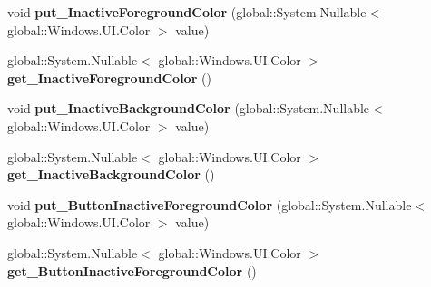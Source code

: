 \begin{DoxyCompactItemize}
void {\bfseries put\+\_\+\+Inactive\+Foreground\+Color} (global\+::\+System.\+Nullable$<$ global\+::\+Windows.\+U\+I.\+Color $>$ value)
\item 
\mbox{\label{interface_windows_1_1_u_i_1_1_view_management_1_1_i_application_view_title_bar_ac13bf0f324d499707bcdcf27bf2749b3}} 
global\+::\+System.\+Nullable$<$ global\+::\+Windows.\+U\+I.\+Color $>$ {\bfseries get\+\_\+\+Inactive\+Foreground\+Color} ()
\item 
\mbox{\label{interface_windows_1_1_u_i_1_1_view_management_1_1_i_application_view_title_bar_a0dc3b1444aee9f60ba18f4386ecc30d0}} 
void {\bfseries put\+\_\+\+Inactive\+Background\+Color} (global\+::\+System.\+Nullable$<$ global\+::\+Windows.\+U\+I.\+Color $>$ value)
\item 
\mbox{\label{interface_windows_1_1_u_i_1_1_view_management_1_1_i_application_view_title_bar_ae1fcd0fba7ae4af9e451a55a07e94dd4}} 
global\+::\+System.\+Nullable$<$ global\+::\+Windows.\+U\+I.\+Color $>$ {\bfseries get\+\_\+\+Inactive\+Background\+Color} ()
\item 
\mbox{\label{interface_windows_1_1_u_i_1_1_view_management_1_1_i_application_view_title_bar_a7e5de3d71b2c3eaa81547caf852dcda9}} 
void {\bfseries put\+\_\+\+Button\+Inactive\+Foreground\+Color} (global\+::\+System.\+Nullable$<$ global\+::\+Windows.\+U\+I.\+Color $>$ value)
\item 
\mbox{\label{interface_windows_1_1_u_i_1_1_view_management_1_1_i_application_view_title_bar_a6b7b15cd7a0d077ceb8c1fdd9f3890ec}} 
global\+::\+System.\+Nullable$<$ global\+::\+Windows.\+U\+I.\+Color $>$ {\bfseries get\+\_\+\+Button\+Inactive\+Foreground\+Color} ()
\item 
\mbox{\label{interface_windows_1_1_u_i_1_1_view_management_1_1_i_application_view_title_bar_a515c5ceabfbfef584b473d37a4db41b0}} 

\end{DoxyCompactItemize}
